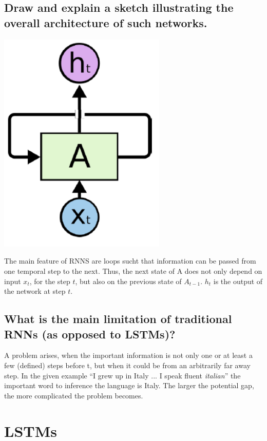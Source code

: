 \subsection{Draw and explain a sketch illustrating the overall  architecture of such networks.}
\begin{minipage}{0.3\textwidth}
\hspace*{1cm}\includegraphics[width=0.6\textwidth]{./img/rnn.png}
\end{minipage}
\begin{minipage}{0.7\textwidth}
The main feature of RNNS are loops sucht that information can be passed from one temporal step to the next. Thus, the next state of A does not only depend on input $x_t$, for the step $t$, but also on the previous state of $A_{t-1}$. $h_t$ is the output of the network at step $t$.
\end{minipage}
\subsection{What is the main limitation of traditional RNNs (as opposed to LSTMs)?}
A problem arises, when the important information is not only one or at least a few (defined) steps before t, but when it could be from an arbitrarily far away step. In the given example ``I grew up in Italy ... I speak fluent \textit{italian}'' the important word to inference the language is Italy.  The larger the potential gap, the more complicated the problem becomes. 
%
\section{LSTMs}
